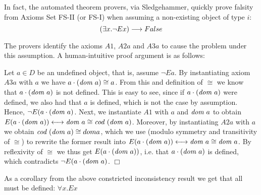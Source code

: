 In fact, the automated theorem provers, via Sledgehammer, quickly
prove falsity from Axioms Set FS-II (or FS-I) when assuming a 
 non-existing object of type $i$:
$$(\exists x. \neg E x) \longrightarrow False$$

The provers identify the axioms $A1$,
 $A2a$ and $A3a$ to cause the problem under this assumption. A
 human-intuitive proof argument is as follows:
 
 Let $a\in D$ be an undefined object, that is, assume $¬E a$.  By
 instantiating axiom $A3a$ with $a$ we have $a \cdot (\textit{dom \/} a) \cong a$.  From
 this and definition of $\cong$ we know that $a \cdot (\textit{dom \/} a)$ is not
 defined. This is easy to see, since if $a \cdot (\textit{dom \/} a)$ were defined, we
 also had that $a$ is defined, which is not the case by assumption.
  Hence, $\neg E (a \cdot (\textit{dom \/} a)$.
Next, we instantiate $A1$ with $a$ and $\textit{dom \/} a$ to obtain
   $E(a \cdot (\textit{dom \/} a)) \longleftrightarrow \textit{dom \/} a \cong \textit{cod \/}(\textit{dom \/} a)$. Moreover,
   by instantiating $A2a$ with $a$ we obtain $\textit{cod \/}(\textit{dom \/} a) \cong dom a$,
   which we use (modulo symmetry and transitivity of $\cong$) to
   rewrite the former result into 
   $E(a \cdot (\textit{dom \/} a)) \longleftrightarrow \textit{dom \/} a \cong \textit{dom \/} a$. By reflexivity of
   $\cong$ we thus get $E(a \cdot (\textit{dom \/} a))$, i.e. that $a \cdot
   (\textit{dom \/} a)$ is defined, which contradicts $\neg E (a \cdot (\textit{dom \/}
   a)$. $\Box$

As a corollary from the above constricted inconsistency result we get that all  must be
defined: $\forall x. E x$









